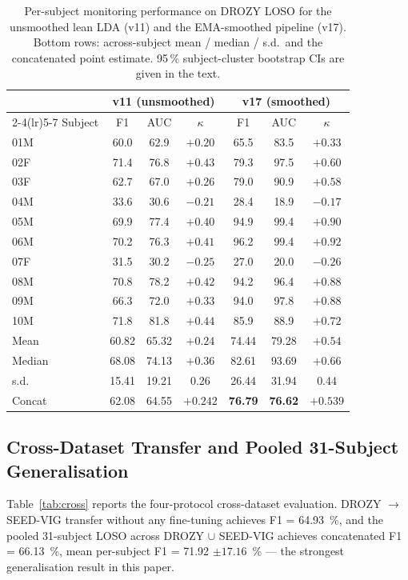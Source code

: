 \documentclass[journal]{IEEEtran}
\DeclareRobustCommand{\add}[1]{#1}                         %
\DeclareRobustCommand{\del}[1]{}                           %
\DeclareRobustCommand{\add}[1]{\hl{#1}}
\DeclareRobustCommand{\del}[1]{{\color{delred}\sout{#1}}\,}
\DeclareRobustCommand{\del}[1]{}                         %
\DeclareRobustCommand{\chg}[2]{\del{#1}\add{#2}}
\begin{document}
\begin{table}[t]
\caption{Per-subject monitoring performance on DROZY LOSO for the unsmoothed lean LDA (v11) and the EMA-smoothed pipeline (v17). Bottom rows: across-subject mean / median / s.d.\ and the concatenated point estimate. 95\,\% subject-cluster bootstrap CIs are given in the text.}
\label{tab:persubj}
\centering
\footnotesize
\setlength{\tabcolsep}{3pt}
\begin{tabular}{l c c c c c c}
\toprule
 & \multicolumn{3}{c}{v11 (unsmoothed)} & \multicolumn{3}{c}{v17 (smoothed)} \\
\cmidrule(lr){2-4}\cmidrule(lr){5-7}
Subject & F1 & AUC & \(\kappa\) & F1 & AUC & \(\kappa\) \\
\midrule
01M & 60.0 & 62.9 & \(+0.20\) & 65.5 & 83.5 & \(+0.33\) \\
02F & 71.4 & 76.8 & \(+0.43\) & 79.3 & 97.5 & \(+0.60\) \\
03F & 62.7 & 67.0 & \(+0.26\) & 79.0 & 90.9 & \(+0.58\) \\
04M & 33.6 & 30.6 & \(-0.21\) & 28.4 & 18.9 & \(-0.17\) \\
05M & 69.9 & 77.4 & \(+0.40\) & 94.9 & 99.4 & \(+0.90\) \\
06M & 70.2 & 76.3 & \(+0.41\) & 96.2 & 99.4 & \(+0.92\) \\
07F & 31.5 & 30.2 & \(-0.25\) & 27.0 & 20.0 & \(-0.26\) \\
08M & 70.8 & 78.2 & \(+0.42\) & 94.2 & 96.4 & \(+0.88\) \\
09M & 66.3 & 72.0 & \(+0.33\) & 94.0 & 97.8 & \(+0.88\) \\
10M & 71.8 & 81.8 & \(+0.44\) & 85.9 & 88.9 & \(+0.72\) \\
\midrule
Mean   & 60.82 & 65.32 & \(+0.24\) & 74.44 & 79.28 & \(+0.54\) \\
Median & 68.08 & 74.13 & \(+0.36\) & 82.61 & 93.69 & \(+0.66\) \\
s.d.   & 15.41 & 19.21 & 0.26 & 26.44 & 31.94 & 0.44 \\
\midrule
Concat & 62.08 & 64.55 & \(+0.242\) & \textbf{76.79} & \textbf{76.62} & \(\mathbf{+0.539}\) \\
\bottomrule
\end{tabular}
\end{table}

\subsection{\chg{Cross-Dataset and Pooled LOSO}{Cross-Dataset Transfer and Pooled 31-Subject Generalisation}}
\label{sec:cross-dataset}
Table~\ref{tab:cross} reports the four-protocol cross-dataset evaluation. DROZY \(\to\) SEED-VIG transfer without any fine-tuning achieves F1 = 64.93~\%, and the pooled 31-subject LOSO across DROZY \(\cup\) SEED-VIG achieves concatenated F1 = 66.13~\%, mean per-subject F1 = 71.92 \(\pm 17.16\)~\% --- the strongest generalisation result in this paper.
\end{document}
